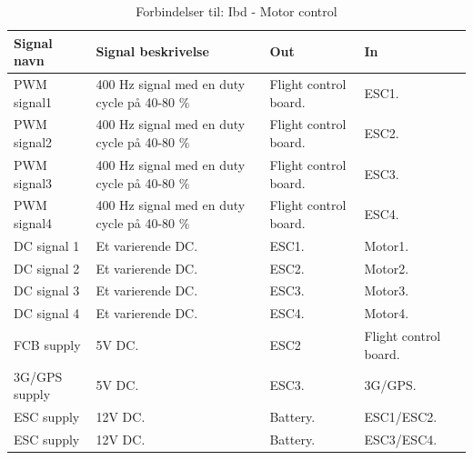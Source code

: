 \begin{table}[H]
	\centering
		\begin{tabular}{|p{2.5 cm}|p{5.5 cm}|p{2.5 cm}|p{2.5 cm}|} 
		\hline
			\textbf{Signal navn} 	& \textbf{Signal beskrivelse}		& \textbf{Out} 				& \textbf{In}     \\ \hline
			PWM signal1 & 400 Hz signal med en duty cycle på 40-80 $\%$ & Flight control board. & ESC1.	\\ \hline
			PWM signal2 & 400 Hz signal med en duty cycle på 40-80 $\%$ & Flight control board. & ESC2.	\\ \hline
			PWM signal3 & 400 Hz signal med en duty cycle på 40-80 $\%$ & Flight control board. &	ESC3. \\ \hline
			PWM signal4 & 400 Hz signal med en duty cycle på 40-80 $\%$ & Flight control board. & ESC4. \\ \hline
			DC signal 1 & Et varierende DC. & ESC1. & Motor1.	\\ \hline
			DC signal 2 & Et varierende DC. & ESC2. & Motor2.	\\ \hline
			DC signal 3 & Et varierende DC. & ESC3. & Motor3.	\\ \hline
			DC signal 4 & Et varierende DC. & ESC4. & Motor4.	\\ \hline
			FCB supply & 5V DC. & ESC2 & Flight control board.	\\ \hline
			3G/GPS supply & 5V DC. & ESC3. & 3G/GPS.	\\ \hline
			ESC supply & 12V DC. & Battery. & ESC1/ESC2.	\\ \hline
			ESC supply & 12V DC. & Battery. & ESC3/ESC4.	\\ \hline
			
		\end{tabular}
	\caption{Forbindelser til: Ibd - Motor control}
	\label{tab:IBD_Motor_control}
\end{table}

